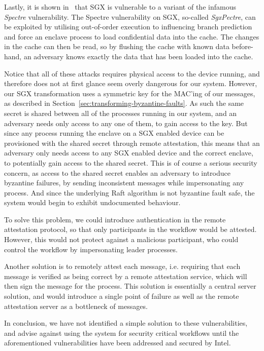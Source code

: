 \documentclass{article}
\begin{document}
	Lastly, it is shown in~\cite{chen_sgxpectre_2018} that SGX is vulnerable to a variant of the infamous \textit{Spectre} vulnerability.
	The Spectre vulnerability on SGX, so-called \textit{SgxPectre}, can be exploited by utilising out-of-order execution to influencing branch prediction and force an enclave process to load confidential data into the cache.
	The changes in the cache can then be read, so by flushing the cache with known data before-hand, an adversary knows exactly the data that has been loaded into the cache.

	Notice that all of these attacks requires physical access to the device running, and therefore does not at first glance seem overly dangerous for our system.
	However, our SGX transformation uses a symmetric key for the MAC'ing of our messages, as described in Section~\ref{sec:transforming-byzantine-faults}.
	As such the same secret is shared between all of the processes running in our system, and an adversary needs only access to any one of them, to gain access to the key.
	But since any process running the enclave on a SGX enabled device can be provisioned with the shared secret through remote attestation, this means that an adversary only needs access to any SGX enabled device and the correct enclave, to potentially gain access to the shared secret.
	This is of course a serious security concern, as access to the shared secret enables an adversary to introduce byzantine failures, by sending inconsistent messages while impersonating any process.
	And since the underlying Raft algorithm is not byzantine fault safe, the system would begin to exhibit undocumented behaviour.

	To solve this problem, we could introduce authentication in the remote attestation protocol, so that only participants in the workflow would be attested.
	However, this would not protect against a malicious participant, who could control the workflow by impersonating leader processes.

	Another solution is to remotely attest each message, i.e. requiring that each message is verified as being correct by a remote attestation service, which will then sign the message for the process.
	This solution is essentially a central server solution, and would introduce a single point of failure as well as the remote attestation server as a bottleneck of messages.

	In conclusion, we have not identified a simple solution to these vulnerabilities, and advise against using the system for security critical workflows until the aforementioned vulnerabilities have been addressed and secured by Intel.
\end{document}
